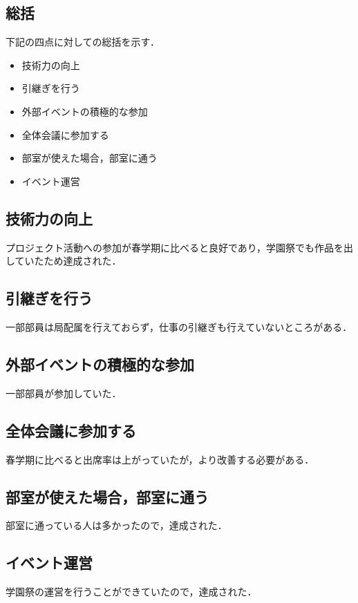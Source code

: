 \subsection*{\secondGrade{}総括}


下記の四点に対しての総括を示す．
\begin{itemize}
    \item 技術力の向上
    \item 引継ぎを行う
    \item 外部イベントの積極的な参加
    \item 全体会議に参加する
    \item 部室が使えた場合，部室に通う
    \item イベント運営
\end{itemize}

\subsection*{技術力の向上}
プロジェクト活動への参加が春学期に比べると良好であり，学園祭でも作品を出していたため達成された．
\subsection*{引継ぎを行う}
一部部員は局配属を行えておらず，仕事の引継ぎも行えていないところがある．
\subsection*{外部イベントの積極的な参加}
一部部員が参加していた．
\subsection*{全体会議に参加する}
春学期に比べると出席率は上がっていたが，より改善する必要がある．
\subsection*{部室が使えた場合，部室に通う}
部室に通っている人は多かったので，達成された．
\subsection*{イベント運営}
学園祭の運営を行うことができていたので，達成された．